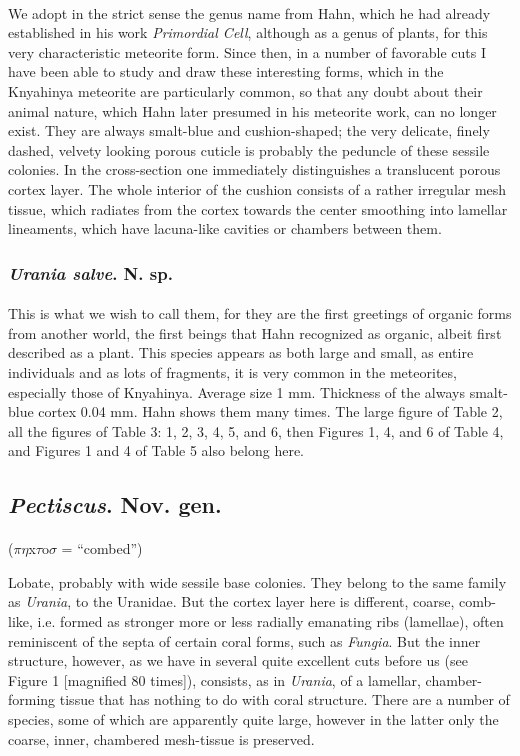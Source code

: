\documentclass[a4paper, 12pt, oneside]{article}
\begin{document}
\paragraph{}
We adopt in the strict sense the genus name from Hahn, which he had already established in his work \emph{Primordial Cell}, although as a genus of plants, for this very characteristic meteorite form. Since then, in a number of favorable cuts I have been able to study and draw these interesting forms, which in the Knyahinya meteorite are particularly common, so that any doubt about their animal nature, which Hahn later presumed in his meteorite work, can no longer exist. They are always smalt-blue and cushion-shaped; the very delicate, finely dashed, velvety looking porous cuticle is probably the peduncle of these sessile colonies. In the cross-section one immediately distinguishes a translucent porous cortex layer. The whole interior of the cushion consists of a rather irregular mesh tissue, which radiates from the cortex towards the center smoothing into lamellar lineaments, which have lacuna-like cavities or chambers between them.
\subsubsection{\emph{Urania salve}. N. sp.}
\paragraph{}
This is what we wish to call them, for they are the first greetings of organic forms from another world, the first beings that Hahn recognized as organic, albeit first described as a plant. This species appears as both large and small, as entire individuals and as lots of fragments, it is very common in the meteorites, especially those of Knyahinya. Average size 1 mm. Thickness of the always smalt-blue cortex 0.04 mm. Hahn shows them many times. The large figure of Table 2, all the figures of Table 3: 1, 2, 3, 4, 5, and 6, then Figures 1, 4, and 6 of Table 4, and Figures 1 and 4 of Table 5 also belong here.
\subsection{\emph{Pectiscus}. Nov. gen.}
\paragraph{}
($\pi\eta$x$\tau$o$\sigma$ = ``combed'')%

Lobate, probably with wide sessile base colonies. They belong to the same family as \emph{Urania}, to the Uranidae. But the cortex layer here is different, coarse, comb-like, i.e. formed as stronger more or less radially emanating ribs (lamellae), often reminiscent of the septa of certain coral forms, such as \emph{Fungia}. But the inner structure, however, as we have in several quite excellent cuts before us (see Figure 1 [magnified 80 times]), consists, as in \emph{Urania}, of a lamellar, chamber-forming tissue that has nothing to do with coral structure. There are a number of species, some of which are apparently quite large, however in the latter only the coarse, inner, chambered mesh-tissue is preserved.
\end{document}
